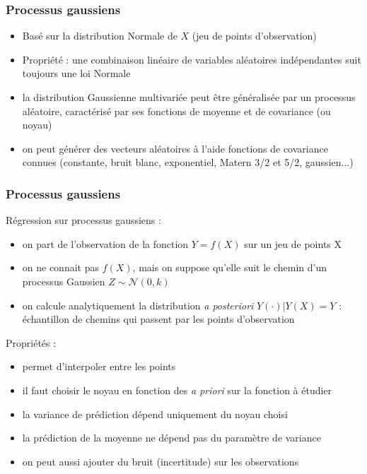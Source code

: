 \documentclass[10pt]{beamer}
\begin{document}
\begin{frame}
\frametitle{Processus gaussiens}

\begin{itemize}
	\item Basé sur la distribution Normale de $ X $ (jeu de points d'observation)
	\item Propriété : une combinaison linéaire de variables aléatoires indépendantes suit toujours une loi Normale
	\item la distribution Gaussienne multivariée peut être généralisée par un processus aléatoire, caractérisé par ses fonctions de moyenne et de covariance (ou noyau)
	\item on peut générer des vecteurs aléatoires à l'aide fonctions de covariance connues (constante, bruit blanc, exponentiel, Matern 3/2 et 5/2, gaussien...)
\end{itemize}

\end{frame}

\begin{frame}
\frametitle{Processus gaussiens}

Régression sur processus gaussiens :
\begin{itemize}
	\item on part de l'observation de la fonction $ Y=f(X) $ sur un jeu de points X
	\item on ne connait pas $ f(X) $, mais on suppose qu'elle suit le chemin d'un processus Gaussien $ Z \sim \mathcal{N}(0, k) $
	\item on calcule analytiquement la distribution \textit{a posteriori} $ Y(\cdotp)|Y(X)=Y $ : échantillon de chemins qui passent par les points d'observation
\end{itemize}

Propriétés :
\begin{itemize}
	\item permet d'interpoler entre les points
	\item il faut choisir le noyau en fonction des \textit{a priori} sur la fonction à étudier
	\item la variance de prédiction dépend uniquement du noyau choisi
	\item la prédiction de la moyenne ne dépend pas du paramètre de variance
	\item on peut aussi ajouter du bruit (incertitude) sur les observations
\end{itemize}

\end{frame}
\end{document}
